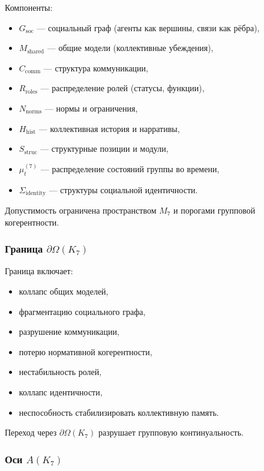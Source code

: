 Компоненты:
\begin{itemize}
    \item $G_{\mathrm{soc}}$ — социальный граф (агенты как вершины, связи как рёбра),
    \item $M_{\mathrm{shared}}$ — общие модели (коллективные убеждения),
    \item $C_{\mathrm{comm}}$ — структура коммуникации,
    \item $R_{\mathrm{roles}}$ — распределение ролей (статусы, функции),
    \item $N_{\mathrm{norms}}$ — нормы и ограничения,
    \item $H_{\mathrm{hist}}$ — коллективная история и нарративы,
    \item $S_{\mathrm{struc}}$ — структурные позиции и модули,
    \item $\mu^{(7)}_t$ — распределение состояний группы во времени,
    \item $\Sigma_{\mathrm{identity}}$ — структуры социальной идентичности.
\end{itemize}

Допустимость ограничена пространством $M_7$ и порогами групповой когерентности.

\subsubsection{Граница \texorpdfstring{$\partial\Omega(K_7)$}{\partial\Omega(K_7)}}

Граница включает:
\begin{itemize}
    \item коллапс общих моделей,
    \item фрагментацию социального графа,
    \item разрушение коммуникации,
    \item потерю нормативной когерентности,
    \item нестабильность ролей,
    \item коллапс идентичности,
    \item неспособность стабилизировать коллективную память.
\end{itemize}

Переход через $\partial\Omega(K_7)$ разрушает групповую континуальность.

\subsubsection{Оси \texorpdfstring{$A(K_7)$}{A(K_7)}}

